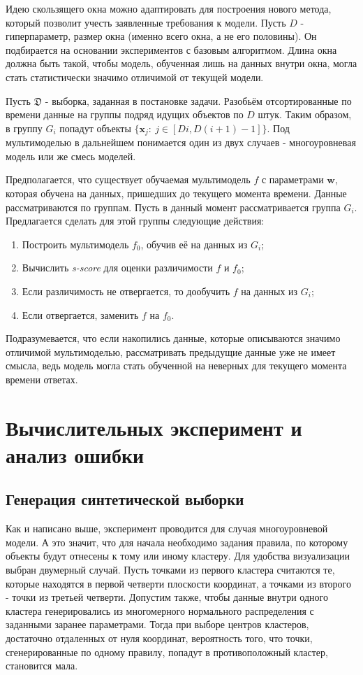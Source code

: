 \documentclass[12pt,twoside]{article}
\begin{document}
Идею скользящего окна можно адаптировать для построения нового метода, который позволит учесть заявленные требования к модели. Пусть $D$ - гиперпараметр, размер окна (именно всего окна, а не его половины). Он подбирается на основании экспериментов с базовым алгоритмом. Длина окна должна быть такой, чтобы модель, обученная лишь на данных внутри окна, могла стать статистически значимо отличимой от текущей модели.

Пусть $\mathfrak{D}$ - выборка, заданная в постановке задачи. Разобьём отсортированные по времени данные на группы подряд идущих объектов по $D$ штук. Таким образом, в группу $G_i$ попадут объекты $\{\mathbf{x}_{j}:\ j \in [Di, D(i + 1) - 1]\}$. Под мультимоделью в дальнейшем понимается один из двух случаев - многоуровневая модель или же смесь моделей.

Предполагается, что существует обучаемая мультимодель $f$ с параметрами $\mathbf{w}$, которая обучена на данных, пришедших до текущего момента времени. Данные рассматриваются по группам. Пусть в данный момент рассматривается группа $G_i$. Предлагается сделать для этой группы следующие действия:

\begin{enumerate}
\item Построить мультимодель $f_0$, обучив её на данных из $G_i$;
\item Вычислить \emph{s-score} для оценки различимости $f$ и $f_0$;
\item Если различимость не отвергается, то дообучить $f$ на данных из $G_i$;
\item Если отвергается, заменить $f$ на $f_0$.
\end{enumerate}

Подразумевается, что если накопились данные, которые описываются значимо отличимой мультимоделью, рассматривать предыдущие данные уже не имеет смысла, ведь модель могла стать обученной на неверных для текущего момента времени ответах.

\section {Вычислительных эксперимент и анализ ошибки}

\subsection {Генерация синтетической выборки}

Как и написано выше, эксперимент проводится для случая многоуровневой модели. А это значит, что для начала необходимо задания правила, по которому объекты будут отнесены к тому или иному кластеру. Для удобства визуализации выбран двумерный случай. Пусть точками из первого кластера считаются те, которые находятся в первой четверти плоскости координат, а точками из второго - точки из третьей четверти. Допустим также, чтобы данные внутри одного кластера генерировались из многомерного нормального распределения с заданными заранее параметрами. Тогда при выборе центров кластеров, достаточно отдаленных от нуля координат, вероятность того, что точки, сгенерированные по одному правилу, попадут в противоположный кластер, становится мала.
\end{document}
